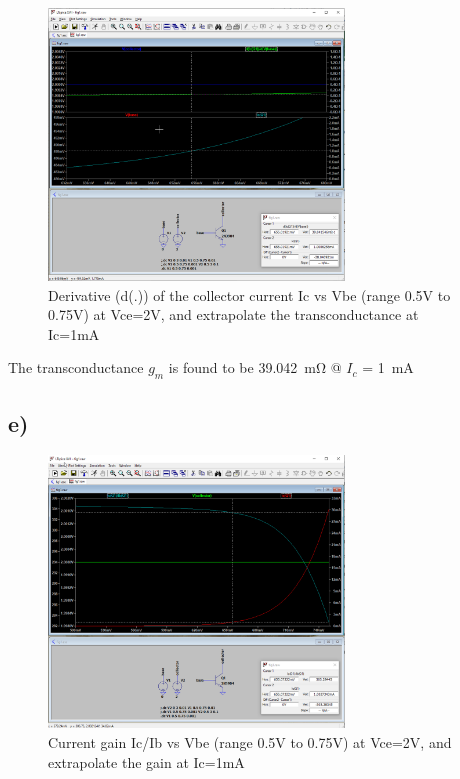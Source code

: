 \documentclass{article}
\begin{document}
	\begin{figure}[H]
	    \centering
	    \includegraphics[width=0.7\textwidth]{1d}
	    \caption{Derivative (d(.)) of the collector current Ic vs Vbe (range 0.5V to 0.75V) at Vce=2V, and extrapolate the
transconductance at Ic=1mA}
	\end{figure}
	
	The transconductance $g_m$ is found to be \SI{39.042}{\milli\ohm} @ $I_c$ = \SI{1}{\mA}
	
	\subsection*{e)}

	\begin{figure}[H]
	    \centering
	    \includegraphics[width=0.7\textwidth]{1e}
	    \caption{Current gain Ic/Ib vs Vbe (range 0.5V to 0.75V) at Vce=2V, and extrapolate the gain at Ic=1mA}
	\end{figure}
	
\end{document}
